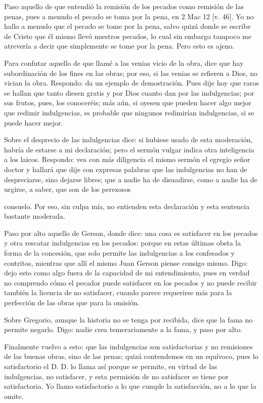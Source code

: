 Paso aquello de que entendió la remisión de los pecados como remisión de las penas, pues a menudo el pecado se toma por la pena, en 2 Mac 12 [v. 46]. Yo no hallo a menudo que el pecado se tome por la pena, salvo quizá donde se escribe de Cristo que él mismo llevó nuestros pecados, lo cual sin embargo tampoco me atrevería a decir que simplemente se tome por la pena. Pero esto es ajeno.

Para confutar aquello de que llamé a las venias vicio de la obra, dice que hay subordinación de los fines en las obras; por eso, si las venias se refieren a Dios, no vician la obra. Respondo: da un ejemplo de demostración. Pues dije hoy que raros se hallan que tanto diesen gratis y por Dios cuanto dan por las indulgencias; por sus frutos, pues, los conoceréis; más aún, si oyesen que pueden hacer algo mejor que redimir indulgencias, es probable que ningunos redimirían indulgencias, si se puede hacer mejor.

Sobre el desprecio de las indulgencias dice: si hubiese usado de esta moderación, habría de estarse a mi declaración; pero el sermón vulgar indica otra inteligencia a los laicos. Respondo: vea con más diligencia el mismo sermón el egregio señor doctor y hallará que dije con expresas palabras que las indulgencias no han de despreciarse, sino dejarse libres; que a nadie ha de disuadirse, como a nadie ha de urgirse, a saber, que son de los perezosos

consuelo. Por eso, sin culpa mía, no entienden esta declaración y esta sentencia bastante moderada.

Paso por alto aquello de Gerson, donde dice: una cosa es satisfacer en los pecados y otra rescatar indulgencias en los pecados: porque en estas últimas obsta la forma de la concesión, que solo permite las indulgencias a los confesados y contritos, mientras que allí el mismo Juan Gerson piense consigo mismo. Digo: dejo esto como algo fuera de la capacidad de mi entendimiento, pues en verdad no comprendo cómo el pecador puede satisfacer en los pecados y no puede recibir también la licencia de no satisfacer, cuando parece requerirse más para la perfección de las obras que para la omisión.

\marginpar{\small[356]} Sobre Gregorio, aunque la historia no se tenga por recibida, dice que la fama no permite negarlo. Digo: nadie crea temerariamente a la fama, y paso por alto.

Finalmente vuelvo a esto: que las indulgencias son satisfactorias y no remisiones de las buenas obras, sino de las penas; quizá contendemos en un equívoco, pues lo satisfactorio el D. D. lo llama así porque se permite, en virtud de las indulgencias, no satisfacer, y esta permisión de no satisfacer se tiene por satisfactoria. Yo llamo satisfactorio a lo que cumple la satisfacción, no a lo que la omite.

